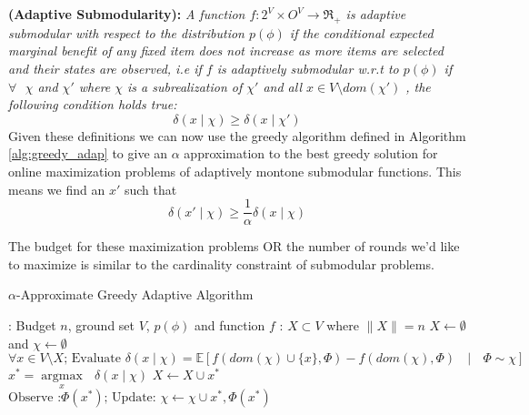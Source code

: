 {\bf {} (Adaptive Submodularity):}
{\it A function $f:2^V \times O^V \rightarrow \Re_+$ is adaptive submodular with respect to the distribution $p(\phi)$ if the conditional expected marginal benefit of any fixed item does not increase as more items are selected and their states are observed, i.e if $f$ is adaptively submodular w.r.t to $p(\phi)$ if $\forall \text{ } \chi$ and $\chi'$ where $\chi$ is a subrealization of $\chi'$ and all $x\in V \setminus dom(\chi')$ , the following condition holds true:}
\[
 \delta(x\mid\chi) \geq \delta(x\mid\chi')
\]
Given these definitions we can now use the greedy algorithm defined in Algorithm \ref{alg:greedy_adap} to give an $\alpha$ approximation to the best greedy solution for online maximization problems of adaptively montone submodular functions. This means we find an $x'$ such that
\[
 \delta(x'\mid\chi) \geq \frac{1}{\alpha}\delta(x\mid\chi)
\]

The budget for these maximization problems OR the number of rounds we'd like to maximize is similar to the cardinality constraint of submodular problems.

\begin{algorithm}[htb]
\caption{$\alpha$-Approximate Greedy Adaptive Algorithm}
\label{alg:greedy_adap}
\begin{algorithmic}[1]
\footnotesize
{}: Budget $n$, ground set $V$, $p(\phi)$ and function $f$ 
: $X \subset V$ where $\|X\| = n$
 $X \leftarrow \emptyset$ and $\chi \leftarrow \emptyset$
  \State $\forall x \in V\setminus X \text{; Evaluate } \delta(x\mid\chi) = \mathbb{E}[f(dom(\chi)\cup\{x\},\Phi) - f(dom(\chi),\Phi) \text{ } \mid \text{ } \Phi \sim \chi]$
  \State $x^* = \underset{x}{\operatorname{argmax }}\text{ } \delta(x\mid\chi)$
  \State $X \leftarrow X \cup {x^*}$
  \State $\text{Observe :} \Phi(x^*) \text{; Update: } \chi \leftarrow \chi \cup {x^*,\Phi(x^*)}$
\EndFor
\end{algorithmic}
\end{algorithm}

